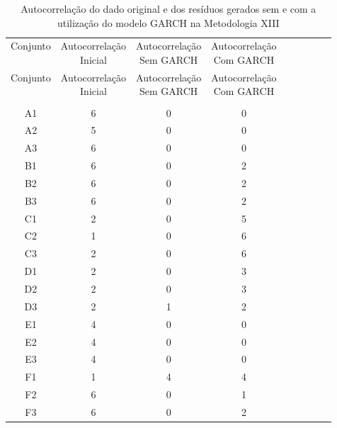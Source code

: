 \begin{center}
\begin{longtable}{ccccc|cccc}
\toprule
\rowcolor{white}
\caption[Metodologia XIII: evolução da autocorrelação]{Autocorrelação do dado
original e dos resíduos gerados sem e com a utilização do modelo GARCH na
Metodologia XIII} \label{tab:EvolucaoAutocorrelacaoMet13}\\
\midrule
Conjunto & \specialcell{Autocorrelação\\Inicial} & \specialcell{Autocorrelação\\Sem
GARCH} & \specialcell{Autocorrelação\\Com GARCH} \\
\midrule
\endfirsthead 
\midrule
\rowcolor{white}
Conjunto & \specialcell{Autocorrelação\\Inicial} & \specialcell{Autocorrelação\\Sem
GARCH} & \specialcell{Autocorrelação\\Com GARCH} \\
\toprule
\endhead
\midrule \\ %
\endfoot
\bottomrule 
\endlastfoot
A1    & 6     & 0     & 0 \\
A2    & 5     & 0     & 0 \\
A3    & 6     & 0     & 0 \\
B1    & 6     & 0     & 2 \\
B2    & 6     & 0     & 2 \\
B3    & 6     & 0     & 2 \\
C1    & 2     & 0     & 5 \\
C2    & 1     & 0     & 6 \\
C3    & 2     & 0     & 6 \\
D1    & 2     & 0     & 3 \\
D2    & 2     & 0     & 3 \\
D3    & 2     & 1     & 2 \\
E1    & 4     & 0     & 0 \\
E2    & 4     & 0     & 0 \\
E3    & 4     & 0     & 0 \\
F1    & 1     & 4     & 4 \\
F2    & 6     & 0     & 1 \\
F3    & 6     & 0     & 2 \\

\end{longtable}
\end{center}

